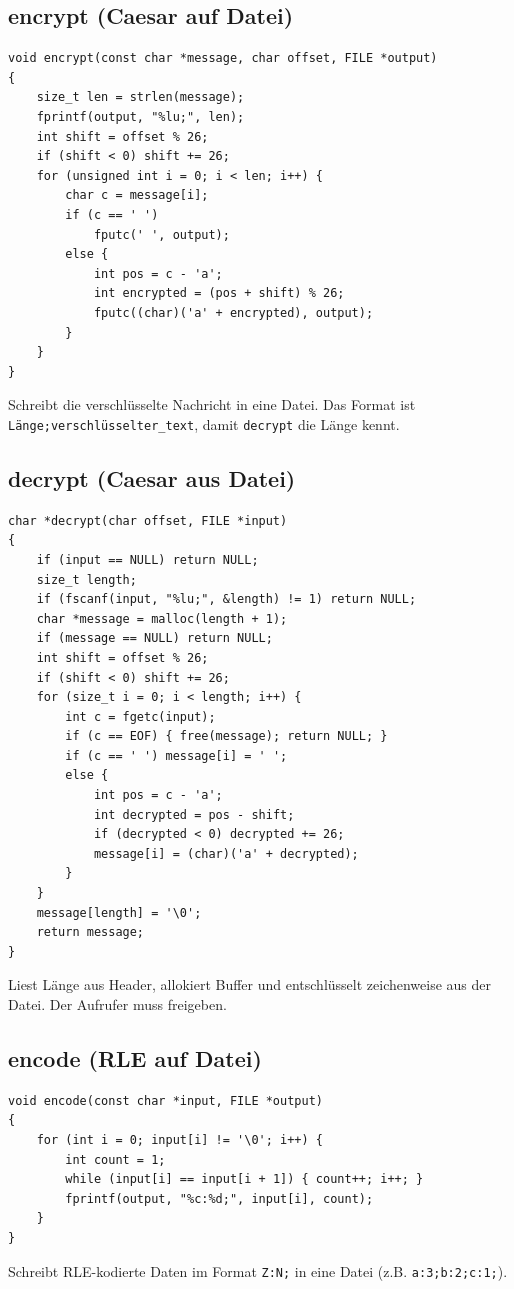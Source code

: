 \documentclass[10pt, a4paper]{article}
\begin{document}
\subsection{encrypt (Caesar auf Datei)}
\begin{lstlisting}
void encrypt(const char *message, char offset, FILE *output)
{
    size_t len = strlen(message);
    fprintf(output, "%lu;", len);
    int shift = offset % 26;
    if (shift < 0) shift += 26;
    for (unsigned int i = 0; i < len; i++) {
        char c = message[i];
        if (c == ' ')
            fputc(' ', output);
        else {
            int pos = c - 'a';
            int encrypted = (pos + shift) % 26;
            fputc((char)('a' + encrypted), output);
        }
    }
}
\end{lstlisting}
Schreibt die verschl\"usselte Nachricht in eine Datei. Das Format ist \texttt{L\"ange;verschl\"usselter\_text}, damit \texttt{decrypt} die L\"ange kennt.

\subsection{decrypt (Caesar aus Datei)}
\begin{lstlisting}
char *decrypt(char offset, FILE *input)
{
    if (input == NULL) return NULL;
    size_t length;
    if (fscanf(input, "%lu;", &length) != 1) return NULL;
    char *message = malloc(length + 1);
    if (message == NULL) return NULL;
    int shift = offset % 26;
    if (shift < 0) shift += 26;
    for (size_t i = 0; i < length; i++) {
        int c = fgetc(input);
        if (c == EOF) { free(message); return NULL; }
        if (c == ' ') message[i] = ' ';
        else {
            int pos = c - 'a';
            int decrypted = pos - shift;
            if (decrypted < 0) decrypted += 26;
            message[i] = (char)('a' + decrypted);
        }
    }
    message[length] = '\0';
    return message;
}
\end{lstlisting}
Liest L\"ange aus Header, allokiert Buffer und entschl\"usselt zeichenweise aus der Datei. Der Aufrufer muss freigeben.

\subsection{encode (RLE auf Datei)}
\begin{lstlisting}
void encode(const char *input, FILE *output)
{
    for (int i = 0; input[i] != '\0'; i++) {
        int count = 1;
        while (input[i] == input[i + 1]) { count++; i++; }
        fprintf(output, "%c:%d;", input[i], count);
    }
}
\end{lstlisting}
Schreibt RLE-kodierte Daten im Format \texttt{Z:N;} in eine Datei (z.B. \texttt{a:3;b:2;c:1;}).
\end{document}
